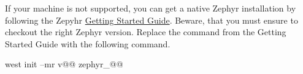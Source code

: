 If your machine is not supported, you can get a native Zephyr installation by following the Zepyhr \href{https://docs.zephyrproject.org/\zephyrversion/develop/getting_started/index.html}{Getting Started Guide}.
Beware, that you must ensure to checkout the right Zephyr version. Replace the  command from the Getting Started Guide with the following command.

\begin{monobox}
west init --mr v@\zephyrversion{}@ zephyr_@\zephyrversion{}@
\end{monobox}

